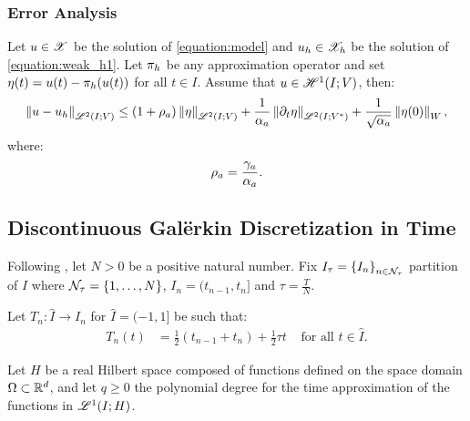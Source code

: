 \subsubsection{Error Analysis}

\begin{theorem} \label{theorem:estimate_h}
    Let $u \in \mathscr{X}$ be the solution of \cref{equation:model} and $u_h \in \mathscr{X}_h$ be the solution of \cref{equation:weak_h1}. Let $\pi_h$ be any approximation operator and set $\eta(t) = u(t) - \pi_h(u(t))$ for all $t \in I$. Assume that $u \in \mathscr{H}^{1}(I; V)$, then:
    \begin{align}
        \left\lVert u - u_h \right\rVert_{\mathscr{L}^{2}(I; V)} \leq \left( 1 + \rho_{a} \right) \left\lVert \eta \right\rVert_{\mathscr{L}^{2}(I; V)} + \frac{1}{\alpha_{a}} \left\lVert \partial_t \eta \right\rVert_{\mathscr{L}^{2}(I; V^*)} + \frac{1}{\sqrt{\alpha_{a}}} \left\lVert \eta(0) \right\rVert_W,
    \end{align}
    where:
    \begin{align}
        \rho_{a} = \frac{\gamma_{a}}{\alpha_{a}}.
    \end{align}
\end{theorem}

\newpage
\subsection{Discontinuous Galërkin Discretization in Time} \label{subsection:time_dg}

Following \cite[p.~177]{Ern2021}, let $N > 0$ be a positive natural number. Fix $I_{\tau} = \left\{ I_n \right\}_{n \in \mathcal{N}_{\tau}}$ partition of $I$ where $\mathcal{N}_{\tau} = \left\{ 1, \dots, N \right\}$, $I_n = (t_{n - 1}, t_n]$ and $\tau = \frac{T}{N}$.

\begin{definition}[Mapping]
    Let $T_n \colon \hat{I} \rightarrow I_n$ for $\hat{I} = (-1, 1]$ be such that:
    \begin{align}
        T_n(t) &= \frac{1}{2}(t_{n - 1} + t_n) + \frac{1}{2} \tau t &\text{ for all } t \in \hat{I}.
    \end{align}
\end{definition}

Let $H$ be a real Hilbert space composed of functions defined on the space domain $\Omega \subset \mathbb{R}^{d}$, and let $q \geq 0$ the polynomial degree for the time approximation of the functions in $\mathscr{L}^{1}(I; H)$.

